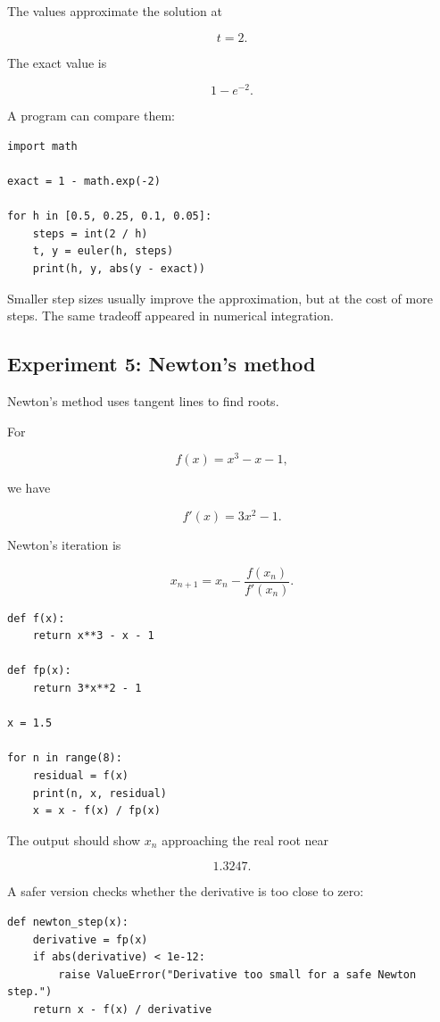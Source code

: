 The values approximate the solution at

\[
t=2.
\]

The exact value is

\[
1-e^{-2}.
\]

A program can compare them:

\begin{verbatim}
import math

exact = 1 - math.exp(-2)

for h in [0.5, 0.25, 0.1, 0.05]:
    steps = int(2 / h)
    t, y = euler(h, steps)
    print(h, y, abs(y - exact))
\end{verbatim}

Smaller step sizes usually improve the approximation, but at the cost of more steps.
The same tradeoff appeared in numerical integration.

\subsection{Experiment 5: Newton's method}
\label{appsubsec:python-newtons-method}

Newton's method uses tangent lines to find roots.

For

\[
f(x)=x^3-x-1,
\]

we have

\[
f'(x)=3x^2-1.
\]

Newton's iteration is

\[
x_{n+1}=x_n-\frac{f(x_n)}{f'(x_n)}.
\]

\begin{verbatim}
def f(x):
    return x**3 - x - 1

def fp(x):
    return 3*x**2 - 1

x = 1.5

for n in range(8):
    residual = f(x)
    print(n, x, residual)
    x = x - f(x) / fp(x)
\end{verbatim}

The output should show \(x_n\) approaching the real root near

\[
1.3247.
\]

A safer version checks whether the derivative is too close to zero:

\begin{verbatim}
def newton_step(x):
    derivative = fp(x)
    if abs(derivative) < 1e-12:
        raise ValueError("Derivative too small for a safe Newton step.")
    return x - f(x) / derivative
\end{verbatim}

